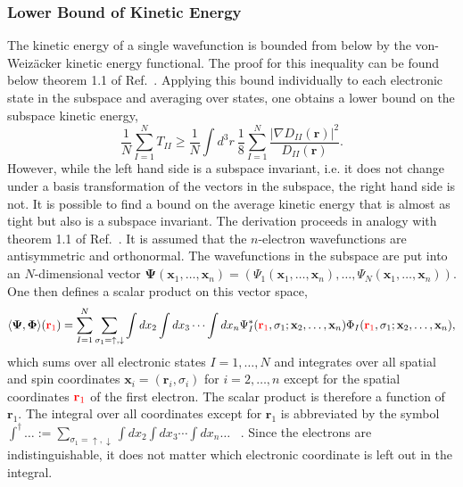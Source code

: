 \documentclass[journal=jpca,manuscript=article,layout=singlecolumn]{achemso}
\renewcommand\vec[1]{\mathbf{#1}}
\begin{document}
\subsubsection{Lower Bound of Kinetic Energy}
The kinetic energy of a single wavefunction is bounded from below by the von-Weiz\"{a}cker kinetic energy functional.
The proof for this inequality can be found below theorem 1.1 of Ref.~\cite{Lieb2002}. Applying this bound individually
to each electronic state in the subspace and averaging over states, one obtains a lower bound on the subspace kinetic energy,
\begin{equation}
 \frac{1}{N} \sum_{I=1}^{N} T_{II} \ge \frac{1}{N} \int d^3r ~ \frac{1}{8} \sum_{I=1}^{N} \frac{\vert \nabla D_{II}(\vec{r}) \vert^2}{D_{II}(\vec{r})}.
 \label{eqn:lower_bound_kinetic_sum_over_states}
\end{equation}
However, while the left hand side is a subspace invariant, i.e. it does not change under a basis transformation of the vectors in the subspace,
the right hand side is not. It is possible to find a bound on the average kinetic energy that is almost as tight but also is a subspace invariant.
The derivation proceeds in analogy with theorem 1.1 of Ref.~\cite{Lieb2002}. It is assumed that the $n$-electron wavefunctions are antisymmetric and orthonormal.
The wavefunctions in the subspace are put into an $N$-dimensional vector
$\vec{\Psi}(\vec{x}_1,\ldots,\vec{x}_n) = \left(\Psi_1(\vec{x}_1,\ldots,\vec{x}_n), \ldots, \Psi_N(\vec{x}_1,\ldots,\vec{x}_n)\right)$. One then defines
a scalar product on this vector space,
\begin{equation}
\langle \vec{\Psi}, \vec{\Phi} \rangle({\color{red} \vec{r}_1}) = \sum_{I=1}^{N} \sum_{\sigma_1=\uparrow,\downarrow} \int dx_2 \int dx_3 \cdots \int dx_n
  \Psi_I^*({\color{red} \vec{r}_1},\sigma_1;\vec{x}_2,\ldots,\vec{x}_n)
  \Phi_I({\color{red} \vec{r}_1},\sigma_1;\vec{x}_2,\ldots,\vec{x}_n),
\end{equation}
which sums over all electronic states $I=1,\ldots,N$ and integrates over all spatial and spin coordinates $\vec{x}_i = (\vec{r}_i,\sigma_i)$ for $i=2,\ldots,n$
except for the spatial coordinates ${\color{red} \vec{r}_1}$
of the first electron. The scalar product is therefore a function of $\vec{r}_1$. The integral over all coordinates except for $\vec{r}_1$ is abbreviated
by the symbol $\int^{\dagger} \ldots := \sum_{\sigma_1=\uparrow,\downarrow} \int dx_2 \int dx_3 \cdots \int dx_n \ldots$ ~.
Since the electrons are indistinguishable, it does not matter which electronic coordinate is left out in the integral.
\end{document}
